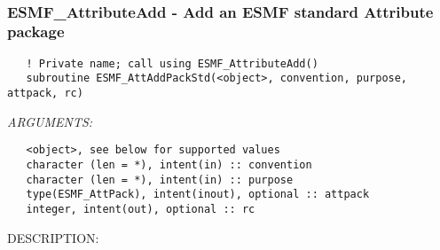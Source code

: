  
\setlength{\oldparskip}{\parskip}
\setlength{\parskip}{1.5ex}
\setlength{\oldparindent}{\parindent}
\setlength{\parindent}{0pt}
\setlength{\oldbaselineskip}{\baselineskip}
\setlength{\baselineskip}{11pt}
 
\def\bv{\begin{verbatim}}
\def\ev{\end{verbatim}}
\def\be{\begin{equation}}
\def\ee{\end{equation}}
\def\bea{\begin{eqnarray}}
\def\eea{\end{eqnarray}}
\def\bi{\begin{itemize}}
\def\ei{\end{itemize}}
\def\bn{\begin{enumerate}}
\def\en{\end{enumerate}}
\def\bd{\begin{description}}
\def\ed{\end{description}}
\def\({\left (}
\def\){\right )}
\def\[{\left [}
\def\]{\right ]}
\def\<{\left  \langle}
\def\>{\right \rangle}
\def\cI{{\cal I}}
\def\diag{\mathop{\rm diag}}
\def\tr{\mathop{\rm tr}}


 
 
 
\mbox{}\hrulefill\ 
 
\subsubsection [ESMF\_AttributeAdd] {ESMF\_AttributeAdd - Add an ESMF standard Attribute package}


  
\begin{verbatim}   ! Private name; call using ESMF_AttributeAdd()
   subroutine ESMF_AttAddPackStd(<object>, convention, purpose, attpack, rc)\end{verbatim}{\em ARGUMENTS:}
\begin{verbatim}   <object>, see below for supported values
   character (len = *), intent(in) :: convention
   character (len = *), intent(in) :: purpose
   type(ESMF_AttPack), intent(inout), optional :: attpack
   integer, intent(out), optional :: rc\end{verbatim}
{\sf DESCRIPTION:\\ }


